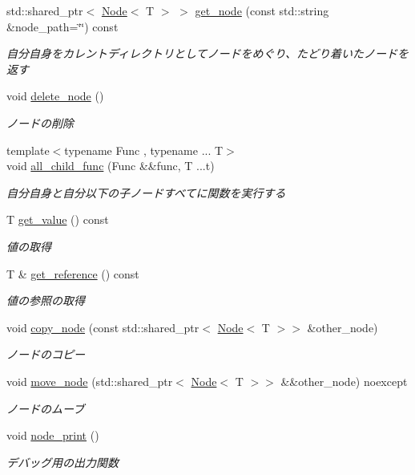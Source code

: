 \begin{DoxyCompactItemize}
std\+::shared\+\_\+ptr$<$ \mbox{\hyperlink{classsaki_1_1_node}{Node}}$<$ T $>$ $>$ \mbox{\hyperlink{classsaki_1_1_node_aa94a7a9a0de9e7d6c5cc362493edc5f5}{get\+\_\+node}} (const std\+::string \&node\+\_\+path=\char`\"{}\char`\"{}) const
\begin{DoxyCompactList}\small\item\em 自分自身をカレントディレクトリとしてノードをめぐり、たどり着いたノードを返す \end{DoxyCompactList}\item 
void \mbox{\hyperlink{classsaki_1_1_node_a57d63d7ba5c2f3bba02a042bbad12dc4}{delete\+\_\+node}} ()
\begin{DoxyCompactList}\small\item\em ノードの削除 \end{DoxyCompactList}\item 
{\footnotesize template$<$typename Func , typename ... T$>$ }\\void \mbox{\hyperlink{classsaki_1_1_node_aad51acc43e01039b19d22f4f09689f3b}{all\+\_\+child\+\_\+func}} (Func \&\&func, T ...t)
\begin{DoxyCompactList}\small\item\em 自分自身と自分以下の子ノードすべてに関数を実行する \end{DoxyCompactList}\item 
T \mbox{\hyperlink{classsaki_1_1_node_a9e88537adb4d8b79fe456f2496ed1bca}{get\+\_\+value}} () const
\begin{DoxyCompactList}\small\item\em 値の取得 \end{DoxyCompactList}\item 
T \& \mbox{\hyperlink{classsaki_1_1_node_a91d632d4db82e0415f394b14c5f6ce58}{get\+\_\+reference}} () const
\begin{DoxyCompactList}\small\item\em 値の参照の取得 \end{DoxyCompactList}\item 
void \mbox{\hyperlink{classsaki_1_1_node_a0ea2c2df4ce2032a5c07e955df4b0046}{copy\+\_\+node}} (const std\+::shared\+\_\+ptr$<$ \mbox{\hyperlink{classsaki_1_1_node}{Node}}$<$ T $>$$>$ \&other\+\_\+node)
\begin{DoxyCompactList}\small\item\em ノードのコピー \end{DoxyCompactList}\item 
void \mbox{\hyperlink{classsaki_1_1_node_ad6fc40d14da87ba8cb39e21bb8f16cdc}{move\+\_\+node}} (std\+::shared\+\_\+ptr$<$ \mbox{\hyperlink{classsaki_1_1_node}{Node}}$<$ T $>$$>$ \&\&other\+\_\+node) noexcept
\begin{DoxyCompactList}\small\item\em ノードのムーブ \end{DoxyCompactList}\item 
void \mbox{\hyperlink{classsaki_1_1_node_ac5b08cdb3fd3c60e38d849b7d18a9782}{node\+\_\+print}} ()
\begin{DoxyCompactList}\small\item\em デバッグ用の出力関数 \end{DoxyCompactList}\end{DoxyCompactItemize}
